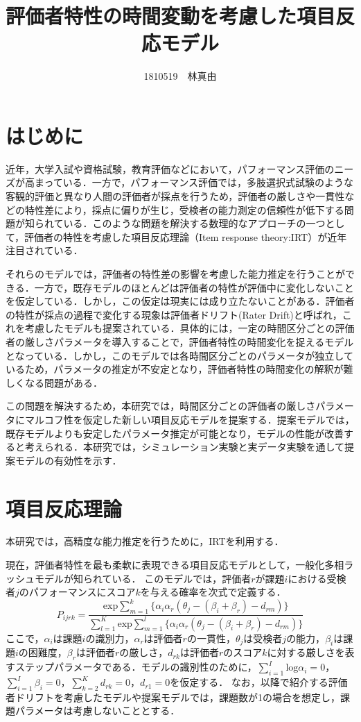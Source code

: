 \documentclass[dvipdfmx, twocolumn, a4paper]{hcresume}
\title{\bf 評価者特性の時間変動を考慮した項目反応モデル}
\author{1810519　林真由}
\begin{document}
\maketitle
\pagestyle{empty}
\thispagestyle{empty}
\section{はじめに}
近年，大学入試や資格試験，教育評価などにおいて，パフォーマンス評価のニーズが高まっている．一方で，パフォーマンス評価では，多肢選択式試験のような客観的評価と異なり人間の評価者が採点を行うため，評価者の厳しさや一貫性などの特性差により，採点に偏りが生じ，受検者の能力測定の信頼性が低下する問題が知られている．このような問題を解決する数理的なアプローチの一つとして，評価者の特性を考慮した項目反応理論（Item response theory:IRT）\cite{IRTLord}が近年注目されている．

それらのモデルでは，評価者の特性差の影響を考慮した能力推定を行うことができる．一方で，既存モデルのほとんどは評価者の特性が評価中に変化しないことを仮定している．しかし，この仮定は現実には成り立たないことがある．評価者の特性が採点の過程で変化する現象は評価者ドリフト(Rater Drift)と呼ばれ，これを考慮したモデルも提案されている．具体的には，一定の時間区分ごとの評価者の厳しさパラメータを導入することで，評価者特性の時間変化を捉えるモデルとなっている．しかし，このモデルでは各時間区分ごとのパラメータが独立しているため，パラメータの推定が不安定となり，評価者特性の時間変化の解釈が難しくなる問題がある．

この問題を解決するため，本研究では，時間区分ごとの評価者の厳しさパラメータにマルコフ性を仮定した新しい項目反応モデルを提案する．提案モデルでは，既存モデルよりも安定したパラメータ推定が可能となり，モデルの性能が改善すると考えられる．本研究では，シミュレーション実験と実データ実験を通して提案モデルの有効性を示す．

\section{項目反応理論}
本研究では，高精度な能力推定を行うために，IRTを利用する．

現在，評価者特性を最も柔軟に表現できる項目反応モデルとして，一般化多相ラッシュモデルが知られている\cite{g-MFRM}．
このモデルでは，評価者$r$が課題$i$における受検者$j$のパフォーマンスにスコア$k$を与える確率を次式で定義する．
\begin{displaymath}
  P_{ijrk}=\frac{\mathrm{exp}\sum_{m=1}^{k}\{\alpha_i\alpha_r(\theta_{j}-(\beta_{i}+\beta_{r})-d_{rm})\}}{\sum_{l=1}^{K}\mathrm{exp}\sum_{m=1}^{l}\{\alpha_i\alpha_r(\theta_{j}-(\beta_{i}+\beta_{r})-d_{rm})\}}
\end{displaymath}
ここで，$\alpha_i$は課題$i$の識別力，$\alpha_r$は評価者$r$の一貫性，$\theta_j$は受検者$j$の能力，$\beta_i$は課題$i$の困難度，$\beta_r$は評価者$r$の厳しさ，$d_{rk}$は評価者$r$のスコア$k$に対する厳しさを表すステップパラメータである．モデルの識別性のために，$\sum^{I}_{i=1}{\mathrm{log}\alpha_i}=0$，$\sum^{I}_{i=1}{\beta_i}=0$，$\sum^{K}_{k=2}{d_{rk}}=0$，$d_{r1}=0$を仮定する．
なお，以降で紹介する評価者ドリフトを考慮したモデルや提案モデルでは，課題数が1の場合を想定し，課題パラメータは考慮しないこととする．
\end{document}
